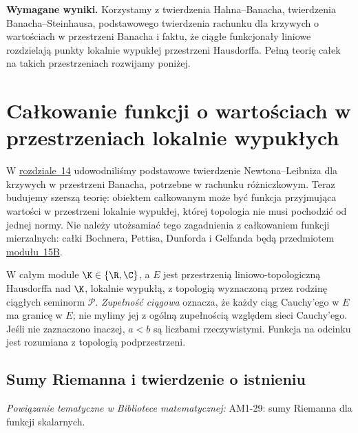 \setcounter{section}{15}
\noindent\textbf{Wymagane wyniki.} Korzystamy z twierdzenia Hahna--Banacha, twierdzenia Banacha--Steinhausa, podstawowego twierdzenia rachunku dla krzywych o wartościach w przestrzeni Banacha i faktu, że ciągłe funkcjonały liniowe rozdzielają punkty lokalnie wypukłej przestrzeni Hausdorffa. Pełną teorię całek na takich przestrzeniach rozwijamy poniżej.
\medskip
\begingroup
\renewcommand{\thesection}{15A}
\renewcommand{\theHsection}{15A}
\section{Całkowanie funkcji o wartościach w przestrzeniach lokalnie wypukłych}
\label{sec:integral-lcs15a}

\providecommand{\atlasref}[2]{#2}


W \hyperref[sec:gateaux-frechet14]{rozdziale~14} udowodniliśmy podstawowe twierdzenie
Newtona--Leibniza dla krzywych w przestrzeni Banacha, potrzebne w rachunku
różniczkowym. Teraz budujemy szerszą teorię: obiektem całkowanym może być
funkcja przyjmująca wartości w przestrzeni lokalnie wypukłej, której topologia
nie musi pochodzić od jednej normy. Nie należy utożsamiać tego zagadnienia
z całkowaniem funkcji mierzalnych: całki Bochnera, Pettisa, Dunforda i Gelfanda
będą przedmiotem \hyperref[sec:integral-vector15b]{modułu~15B}.

W całym module $\K\in\{\R,\C\}$, a $E$ jest przestrzenią liniowo-topologiczną
Hausdorffa nad $\K$, lokalnie wypukłą, z topologią wyznaczoną przez rodzinę
ciągłych seminorm $\mathcal P$. \emph{Zupełność ciągowa} oznacza, że każdy
ciąg Cauchy'ego w $E$ ma granicę w $E$; nie mylimy jej z ogólną zupełnością
względem sieci Cauchy'ego. Jeśli nie zaznaczono inaczej, $a<b$ są liczbami
rzeczywistymi. Funkcja na odcinku jest rozumiana z topologią podprzestrzeni.

\subsection{Sumy Riemanna i twierdzenie o istnieniu}

\noindent\emph{Powiązanie tematyczne w Bibliotece matematycznej:} \atlasref{AM1-29::ma1:def:riemann-sum}{AM1-29: sumy Riemanna dla funkcji skalarnych}.


